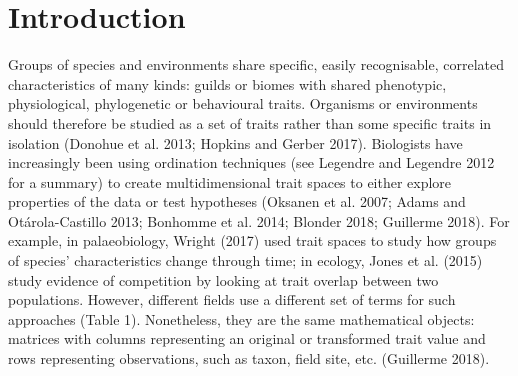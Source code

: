 \documentclass[]{article}
\begin{document}
\section{Introduction}\label{introduction}

Groups of species and environments share specific, easily recognisable,
correlated characteristics of many kinds: guilds or biomes with shared
phenotypic, physiological, phylogenetic or behavioural traits. Organisms
or environments should therefore be studied as a set of traits rather
than some specific traits in isolation (Donohue et al. 2013; Hopkins and
Gerber 2017). Biologists have increasingly been using ordination
techniques (see Legendre and Legendre 2012 for a summary) to create
multidimensional trait spaces to either explore properties of the data
or test hypotheses (Oksanen et al. 2007; Adams and Otárola-Castillo
2013; Bonhomme et al. 2014; Blonder 2018; Guillerme 2018). For example,
in palaeobiology, Wright (2017) used trait spaces to study how groups of
species' characteristics change through time; in ecology, Jones et al.
(2015) study evidence of competition by looking at trait overlap between
two populations. However, different fields use a different set of terms
for such approaches (Table 1). Nonetheless, they are the same
mathematical objects: matrices with columns representing an original or
transformed trait value and rows representing observations, such as
taxon, field site, etc. (Guillerme 2018).
\end{document}
